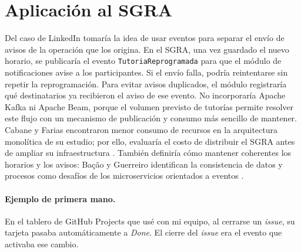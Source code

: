 \section{Aplicación al SGRA}
Del caso de LinkedIn tomaría la idea de usar eventos para separar el envío de
avisos de la operación que los origina. En el SGRA, una vez guardado el nuevo
horario, se publicaría el evento \texttt{TutoriaReprogramada} para que el módulo
de notificaciones avise a los participantes. Si el envío falla, podría
reintentarse sin repetir la reprogramación. Para evitar avisos duplicados,
el módulo registraría qué destinatarios ya recibieron el aviso de ese evento.
No incorporaría Apache Kafka ni Apache Beam, porque el volumen previsto de
tutorías permite resolver este flujo con un mecanismo de publicación y consumo
más sencillo de mantener. Cabane y Farias encontraron menor consumo de recursos
en la arquitectura monolítica de su estudio; por ello, evaluaría el costo de
distribuir el SGRA antes de ampliar su infraestructura \cite{cabane2024eda}.
También definiría cómo mantener coherentes los horarios y los avisos: Bação y
Guerreiro identifican la consistencia de datos y procesos como desafíos de los
microservicios orientados a eventos \cite{bacao2026consistency}.

\paragraph{Ejemplo de primera mano.}
En el tablero de GitHub Projects que usé con mi equipo, al cerrarse un
\textit{issue}, su tarjeta pasaba automáticamente a \textit{Done}.
El cierre del \textit{issue} era el evento que activaba ese cambio.
